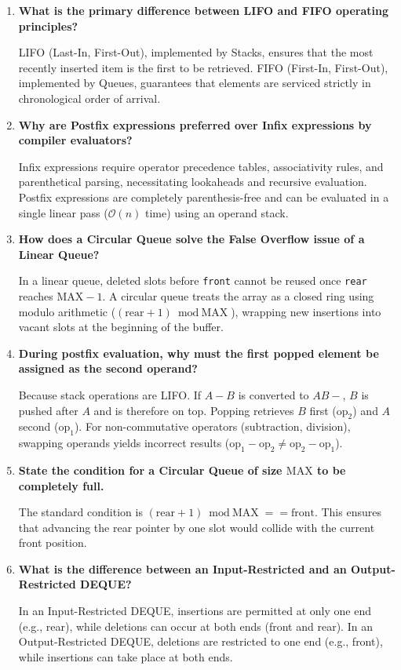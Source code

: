 \documentclass[12pt,a4paper]{article}
\newcommand{\Q}[1]{\textbf{#1}\par\noindent\ignorespaces}
\begin{document}
\begin{tcolorbox}[exambox, title={\textbf{Frequently Asked / Viva Questions (Part 1)}}]
\begin{enumerate}[topsep=0pt, label=\textbf{Q\arabic*.}, itemsep=4pt]
  \item \Q{What is the primary difference between LIFO and FIFO operating principles?}
  LIFO (Last-In, First-Out), implemented by Stacks, ensures that the most recently inserted item is the first to be retrieved. FIFO (First-In, First-Out), implemented by Queues, guarantees that elements are serviced strictly in chronological order of arrival.

  \item \Q{Why are Postfix expressions preferred over Infix expressions by compiler evaluators?}
  Infix expressions require operator precedence tables, associativity rules, and parenthetical parsing, necessitating lookaheads and recursive evaluation. Postfix expressions are completely parenthesis-free and can be evaluated in a single linear pass ($\mathcal{O}(n)$ time) using an operand stack.

  \item \Q{How does a Circular Queue solve the False Overflow issue of a Linear Queue?}
  In a linear queue, deleted slots before \texttt{front} cannot be reused once \texttt{rear} reaches $\text{MAX}-1$. A circular queue treats the array as a closed ring using modulo arithmetic ($(\text{rear}+1) \bmod \text{MAX}$), wrapping new insertions into vacant slots at the beginning of the buffer.

  \item \Q{During postfix evaluation, why must the first popped element be assigned as the second operand?}
  Because stack operations are LIFO. If $A - B$ is converted to $A B -$, $B$ is pushed after $A$ and is therefore on top. Popping retrieves $B$ first ($\text{op}_2$) and $A$ second ($\text{op}_1$). For non-commutative operators (subtraction, division), swapping operands yields incorrect results ($\text{op}_1 - \text{op}_2 \ne \text{op}_2 - \text{op}_1$).

  \item \Q{State the condition for a Circular Queue of size $\text{MAX}$ to be completely full.}
  The standard condition is $(\text{rear} + 1) \bmod \text{MAX} == \text{front}$. This ensures that advancing the rear pointer by one slot would collide with the current front position.

  \item \Q{What is the difference between an Input-Restricted and an Output-Restricted DEQUE?}
  In an Input-Restricted DEQUE, insertions are permitted at only one end (e.g., rear), while deletions can occur at both ends (front and rear). In an Output-Restricted DEQUE, deletions are restricted to one end (e.g., front), while insertions can take place at both ends.


\end{enumerate}
\end{tcolorbox}
\end{document}
